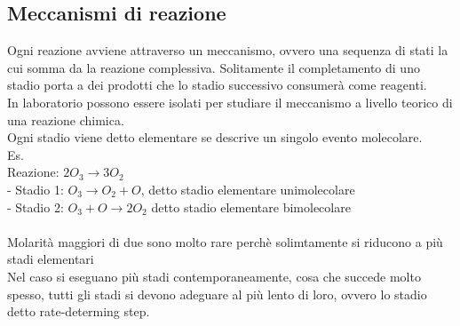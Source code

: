 \subsection{Meccanismi di reazione}
Ogni reazione avviene attraverso un meccanismo, ovvero una sequenza di stati la cui somma da la reazione complessiva. Solitamente il completamento di uno stadio porta a dei prodotti che lo stadio successivo consumerà come reagenti.\\
In laboratorio possono essere isolati per studiare il meccanismo a livello teorico di una reazione chimica.\\
Ogni stadio viene detto elementare se descrive un singolo evento molecolare.\\
Es.\\
Reazione: $2O_3 \rightarrow 3O_2$\\
\tab- Stadio 1: $O_3 \rightarrow O_2 + O$, detto stadio elementare unimolecolare\\
\tab- Stadio 2: $O_3 + O \rightarrow 2O_2$ detto stadio elementare bimolecolare\\\\
Molarità maggiori di due sono molto rare perchè solimtamente si riducono a più stadi elementari\\
Nel caso si eseguano più stadi contemporaneamente, cosa che succede molto spesso, tutti gli stadi si devono adeguare al più lento di loro, ovvero lo stadio detto rate-determing step.
